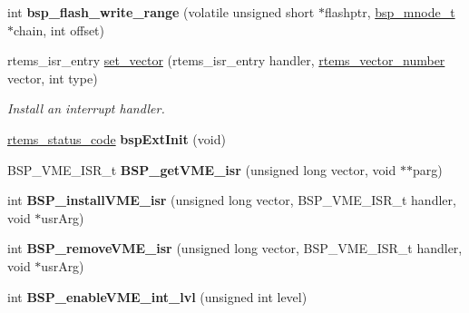 \begin{DoxyCompactItemize}
\item 
\mbox{\label{group__RTEMSBSPsM68kUC5282_gabd72add5793a22f1d01aba9e69241f48}} 
int {\bfseries bsp\+\_\+flash\+\_\+write\+\_\+range} (volatile unsigned short $\ast$flashptr, \mbox{\hyperlink{structbsp__mnode__t}{bsp\+\_\+mnode\+\_\+t}} $\ast$chain, int offset)
\item 
rtems\+\_\+isr\+\_\+entry \mbox{\hyperlink{group__RTEMSBSPsM68kUC5282_gab3388042c56b34c40be81fd5f028d97e}{set\+\_\+vector}} (rtems\+\_\+isr\+\_\+entry handler, \mbox{\hyperlink{group__ClassicINTR_ga3e434c197d99f128e78cae4d9358bd8b}{rtems\+\_\+vector\+\_\+number}} vector, int type)
\begin{DoxyCompactList}\small\item\em Install an interrupt handler. \end{DoxyCompactList}\item 
\mbox{\label{group__RTEMSBSPsM68kUC5282_ga63b67337342502ef24fa826d864f3f36}} 
\mbox{\hyperlink{group__ClassicStatus_ga545d41846817eaba6143d52ee4d9e9fe}{rtems\+\_\+status\+\_\+code}} {\bfseries bsp\+Ext\+Init} (void)
\item 
\mbox{\label{group__RTEMSBSPsM68kUC5282_gaba35cc62a6d687cff28e85ff41d520bb}} 
B\+S\+P\+\_\+\+V\+M\+E\+\_\+\+I\+S\+R\+\_\+t {\bfseries B\+S\+P\+\_\+get\+V\+M\+E\+\_\+isr} (unsigned long vector, void $\ast$$\ast$parg)
\item 
\mbox{\label{group__RTEMSBSPsM68kUC5282_ga44482d6fe76173fed0714d224f88db4b}} 
int {\bfseries B\+S\+P\+\_\+install\+V\+M\+E\+\_\+isr} (unsigned long vector, B\+S\+P\+\_\+\+V\+M\+E\+\_\+\+I\+S\+R\+\_\+t handler, void $\ast$usr\+Arg)
\item 
\mbox{\label{group__RTEMSBSPsM68kUC5282_ga64256472522bb88d140c570b11ff3005}} 
int {\bfseries B\+S\+P\+\_\+remove\+V\+M\+E\+\_\+isr} (unsigned long vector, B\+S\+P\+\_\+\+V\+M\+E\+\_\+\+I\+S\+R\+\_\+t handler, void $\ast$usr\+Arg)
\item 
\mbox{\label{group__RTEMSBSPsM68kUC5282_ga516ff09efe8cce2f7a2585f48c739a04}} 
int {\bfseries B\+S\+P\+\_\+enable\+V\+M\+E\+\_\+int\+\_\+lvl} (unsigned int level)
\item 
$$
\end{DoxyCompactItemize}
